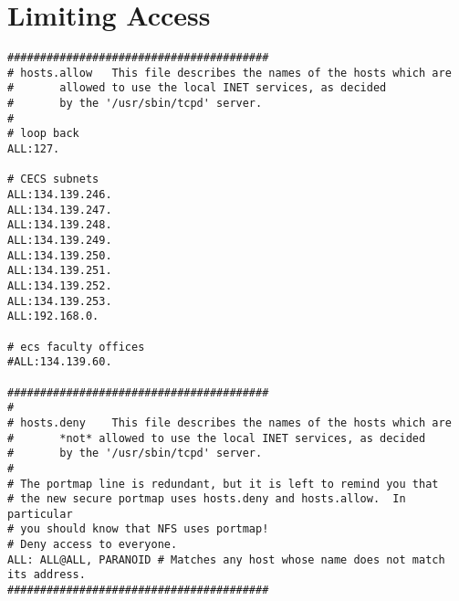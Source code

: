 \chapter{Limiting Access}

\begin{verbatim}
########################################
# hosts.allow	This file describes the names of the hosts which are
#		allowed to use the local INET services, as decided
#		by the '/usr/sbin/tcpd' server.
#
# loop back
ALL:127.

# CECS subnets
ALL:134.139.246.
ALL:134.139.247.
ALL:134.139.248.
ALL:134.139.249.
ALL:134.139.250.
ALL:134.139.251.
ALL:134.139.252.
ALL:134.139.253.
ALL:192.168.0.

# ecs faculty offices
#ALL:134.139.60.

########################################
#
# hosts.deny	This file describes the names of the hosts which are
#		*not* allowed to use the local INET services, as decided
#		by the '/usr/sbin/tcpd' server.
#
# The portmap line is redundant, but it is left to remind you that
# the new secure portmap uses hosts.deny and hosts.allow.  In particular
# you should know that NFS uses portmap!
# Deny access to everyone.
ALL: ALL@ALL, PARANOID # Matches any host whose name does not match its address.
########################################
\end{verbatim}

